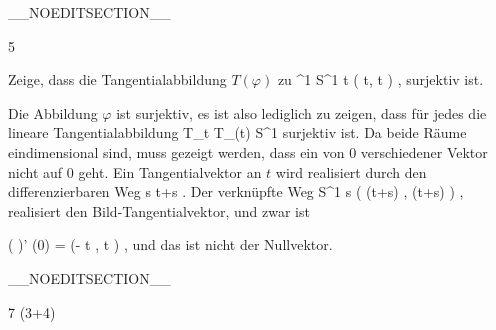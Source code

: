 __NOEDITSECTION__

{5}

{

Zeige, dass die Tangentialabbildung $T(\varphi)$ zu
\maabbeledisp {\varphi} {\R^1} {S^1
} { t } {( \cos  t, \sin  t  )
} {,}
surjektiv ist.

}
{

Die Abbildung $\varphi$ ist surjektiv, es ist also lediglich zu zeigen, dass für jedes
 die lineare Tangentialabbildung
\maabbdisp {} {T_t \R \cong \R} {   T_{\varphi(t)} S^1
} {}
surjektiv ist. Da beide Räume eindimensional sind, muss gezeigt werden, dass ein von $0$ verschiedener Vektor nicht auf $0$ geht. Ein Tangentialvektor an $t$ wird realisiert durch den differenzierbaren Weg
\maabbeledisp {\gamma} {\R} {\R
} { s } {t+s
} {.}
Der verknüpfte Weg
\maabbeledisp {\varphi \circ \gamma} {\R} {S^1
} { s } { ( \cos (t+s)  , \sin (t+s)  )
} {,}
realisiert den Bild-Tangentialvektor, und zwar ist
 {} {}

\mavergleichskettedisp
{\vergleichskette
{( \varphi \circ \gamma)' (0)
}
{ =} {(- \sin  t , \cos  t  )
}
{ } {
}
{ } {
}
{ } {
}
}
{}{}{,}
und das ist nicht der Nullvektor.

 }

__NOEDITSECTION__

{7 (3+4)}

